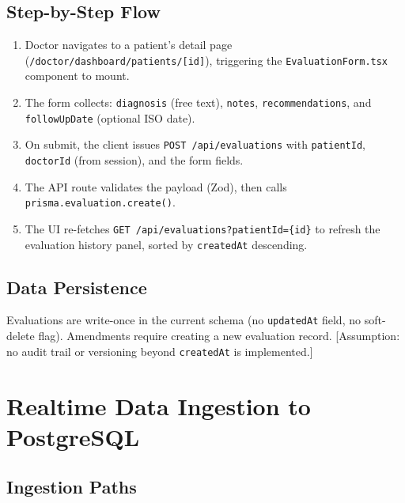 \documentclass[12pt,a4paper]{report}
\begin{document}
\subsection{Step-by-Step Flow}

\begin{enumerate}[leftmargin=1.5em, itemsep=0.2em]
  \item Doctor navigates to a patient's detail page
        (\texttt{/doctor/dashboard/patients/[id]}), triggering the
        \texttt{EvaluationForm.tsx} component to mount.

  \item The form collects: \texttt{diagnosis} (free text),
        \texttt{notes}, \texttt{recommendations}, and
        \texttt{followUpDate} (optional ISO date).

  \item On submit, the client issues \texttt{POST /api/evaluations}
        with \texttt{patientId}, \texttt{doctorId} (from session),
        and the form fields.

  \item The API route validates the payload (Zod), then calls
        \texttt{prisma.evaluation.create()}.

  \item The UI re-fetches \texttt{GET /api/evaluations?patientId=\{id\}}
        to refresh the evaluation history panel, sorted by
        \texttt{createdAt} descending.
\end{enumerate}

\subsection{Data Persistence}

Evaluations are write-once in the current schema (no \texttt{updatedAt}
field, no soft-delete flag). Amendments require creating a new
evaluation record. [Assumption: no audit trail or versioning beyond
\texttt{createdAt} is implemented.]

\section{Realtime Data Ingestion to PostgreSQL}
\label{sec:ingest}

\subsection{Ingestion Paths}
\end{document}
